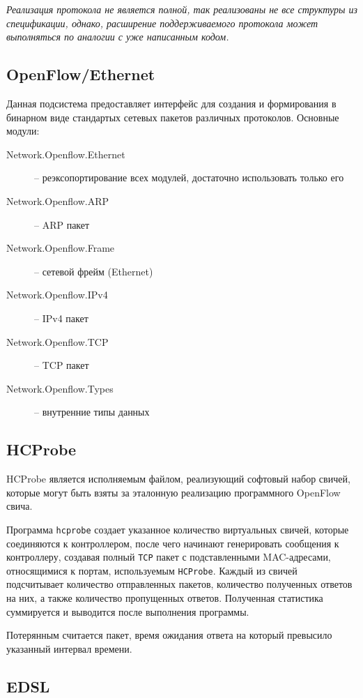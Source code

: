 \documentclass[9pt,a4paper]{article}
\begin{document}
\emph{Реализация протокола не является полной, так реализованы не все структуры из
спецификации, однако, расширение поддерживаемого протокола может выполняться по аналогии с
уже написанным кодом.}

\subsection{OpenFlow/Ethernet}

Данная подсистема предоставляет интерфейс для создания и формирования в бинарном виде
стандартых сетевых пакетов различных протоколов.
Основные модули:

\begin{description}
  \item[Network.Openflow.Ethernet] -- реэксопортирование всех модулей, достаточно использовать только его
  \item[Network.Openflow.ARP]      -- ARP пакет
  \item[Network.Openflow.Frame]    -- сетевой фрейм (Ethernet)
  \item[Network.Openflow.IPv4]     -- IPv4 пакет
  \item[Network.Openflow.TCP]      -- TCP пакет
  \item[Network.Openflow.Types]    -- внутренние типы данных
\end{description}

\subsection{HCProbe}

HCProbe является исполняемым файлом, реализующий софтовый набор свичей, которые могут
быть взяты за эталонную реализацию программного OpenFlow свича.

Программа \texttt{hcprobe} создает указанное количество виртуальных свичей,
которые соединяются к контроллером, после чего начинают генерировать сообщения
к контроллеру, создавая полный \texttt{TCP} пакет с подставленными MAC-адресами,
относящимися к портам, используемым \texttt{HCProbe}. Каждый из свичей 
подсчитывает количество отправленных пакетов, количество полученных ответов на них,
а также количество пропущенных ответов. Полученная статистика суммируется и выводится
после выполнения программы.

Потерянным считается пакет, время ожидания ответа на который превысило указанный
интервал времени.

\subsection{EDSL}
\end{document}
